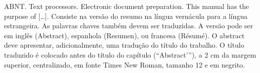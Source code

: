 \begin{englishabstract}
    {}
    {ABNT. Text processors. Electronic document preparation.}
    This manual has the purpose of [\ldots].
    Consiste na versão do resumo na língua vernácula para a língua estrangeira.
    As palavras chaves também devem ser traduzidas.
    A versão pode ser em inglês (Abstract), espanhola (Resumen), ou francesa (Résumé).
    O abstract deve apresentar, adicionalmente, uma tradução do título do trabalho.
    O título traduzido é colocado antes do título do capítulo (“Abstract’”), a
    2 cm da margem superior, centralizado, em fonte Times New Roman, tamanho 12 e em negrito.
\end{englishabstract}